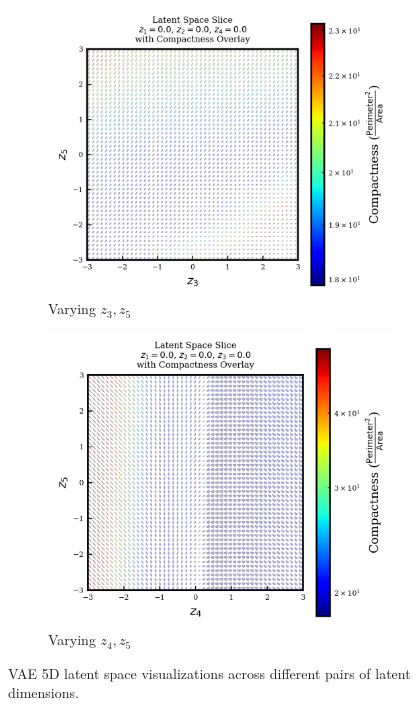 \documentclass{article}
\begin{document}
\begin{figure}[H]
    \vspace{0.5em}
    
    \begin{subfigure}{0.45\textwidth}
        \includegraphics[width=\linewidth]{figures/VAEmodels/model4/varying_z3_z5_fixed_z1=0.0_z2=0.0_z4=0.0.png}
        \caption{Varying $z_3, z_5$}
    \end{subfigure}
    \hfill
    \begin{subfigure}{0.45\textwidth}
        \includegraphics[width=\linewidth]{figures/VAEmodels/model4/varying_z4_z5_fixed_z1=0.0_z2=0.0_z3=0.0.png}
        \caption{Varying $z_4, z_5$}
    \end{subfigure}

    \caption{VAE 5D latent space visualizations across different pairs of latent dimensions.}
    \label{fig:vae_model4}
\end{figure}
\end{document}
